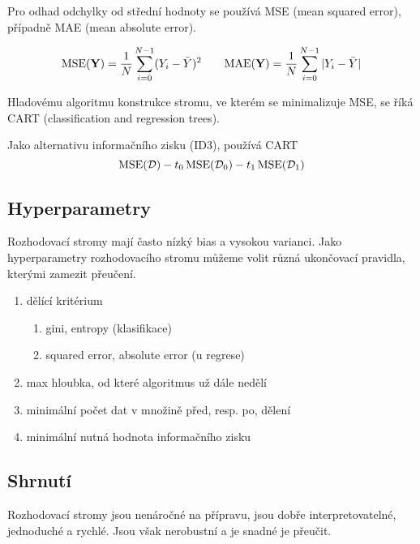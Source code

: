 Pro odhad odchylky od střední hodnoty se používá MSE (mean squared error), případně MAE (mean absolute error).

\begin{equation*}
    \begin{aligned}[t]
        \operatorname{MSE}(\mathbf{Y}) = \frac{1}{N} \sum_{i=0}^{N-1} (Y_i - \bar{Y})^2
    \end{aligned}
    \qquad
    \begin{aligned}[t]
        \operatorname{MAE}(\mathbf{Y}) = \frac{1}{N} \sum_{i=0}^{N-1} |Y_i - \bar{Y}|
    \end{aligned}
\end{equation*}

Hladovému algoritmu konstrukce stromu, ve kterém se minimalizuje MSE, se říká CART (classification and regression trees).

Jako alternativu informačního zisku (ID3), používá CART
\begin{equation*}
    \operatorname{MSE}(\mathcal{D}) - t_0 \operatorname{MSE}(\mathcal{D}_0) - t_1 \operatorname{MSE}(\mathcal{D}_1)
\end{equation*}

\subsection{Hyperparametry}

Rozhodovací stromy mají často nízký bias a vysokou varianci. Jako hyperparametry rozhodovacího stromu můžeme volit různá ukončovací pravidla, kterými zamezit přeučení.
\begin{enumerate}
    \item dělící kritérium
          \begin{enumerate}
              \item gini, entropy (klasifikace)
              \item squared error, absolute error (u regrese)
          \end{enumerate}
    \item max hloubka, od které algoritmus už dále nedělí
    \item minimální počet dat v množině před, resp. po, dělení
    \item minimální nutná hodnota informačního zisku
\end{enumerate}

\subsection{Shrnutí}

Rozhodovací stromy jsou nenáročné na přípravu, jsou dobře interpretovatelné, jednoduché a rychlé. Jsou však nerobustní a je snadné je přeučit.
